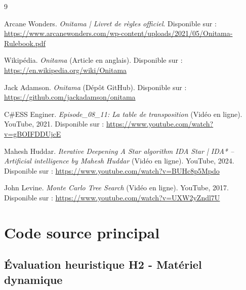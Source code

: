 \documentclass[12pt, a4paper]{article}
\begin{document}
\newpage
\begin{thebibliography}{9}

Arcane Wonders.
\textit{Onitama | Livret de règles officiel}.
\newline Disponible sur : \url{https://www.arcanewonders.com/wp-content/uploads/2021/05/Onitama-Rulebook.pdf}

Wikipédia.
\textit{Onitama} (Article en anglais).
\newline Disponible sur : \url{https://en.wikipedia.org/wiki/Onitama}

Jack Adamson.
\textit{Onitama} (Dépôt GitHub).
\newline Disponible sur : \url{https://github.com/jackadamson/onitama}

C\#ESS Enginer.
\textit{Episode\_08\_11: La table de transposition} (Vidéo en ligne).
YouTube, 2021.
\newline Disponible sur : \url{https://www.youtube.com/watch?v=gBOIFDDUjcE}

Mahesh Huddar.
\textit{
Iterative Deepening A Star algorithm IDA Star | IDA* – Artificial intelligence by Mahesh Huddar} (Vidéo en ligne).
YouTube, 2024.
\newline Disponible sur : \url{https://www.youtube.com/watch?v=BUHc8p5Mpdo}

John Levine.
\textit{Monte Carlo Tree Search} (Vidéo en ligne).
YouTube, 2017.
\newline Disponible sur : \url{https://www.youtube.com/watch?v=UXW2yZndl7U}

\end{thebibliography}

\appendix
\newpage
\section{Code source principal}
\label{ann:code}

\subsection{Évaluation heuristique H2  - Matériel dynamique}
\end{document}
